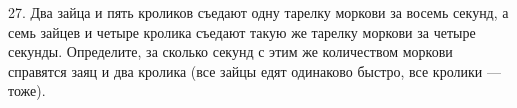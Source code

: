 27. Два зайца и пять кроликов съедают одну тарелку моркови за восемь секунд, а семь зайцев и четыре кролика съедают такую же тарелку моркови за четыре секунды. Определите, за сколько секунд с этим же количеством моркови справятся заяц и два кролика (все зайцы едят одинаково быстро, все кролики --- тоже).\\
